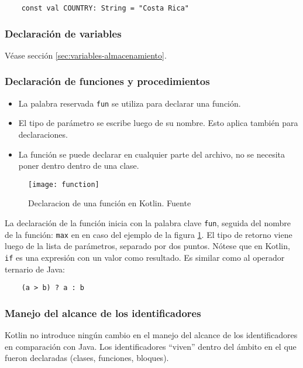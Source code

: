 \begin{verbatim}
    const val COUNTRY: String = "Costa Rica"
\end{verbatim}

\subsubsection{Declaración de variables}
Véase sección \ref{sec:variables-almacenamiento}.

\subsubsection{Declaración de funciones y procedimientos}
\begin{itemize}
    \item La palabra reservada \texttt{fun} se utiliza para declarar una función. 
    \item El tipo de parámetro se escribe luego de su nombre. Esto aplica también para declaraciones.
    \item La función se puede declarar en cualquier parte del archivo, no se necesita poner dentro dentro de una clase.
\end{itemize}

\begin{figure}[h!]
  \texttt{[image: function]}
  \caption{Declaracion de una función en Kotlin. Fuente \cite{kotlin-in-action}}
  \label{fig:kotlin-function-declaration}
\end{figure} 

La declaración de la función inicia con la palabra clave \texttt{fun}, seguida del nombre de la función: \texttt{max} en en caso del ejemplo de la figura \ref{fig:kotlin-function-declaration}. El tipo de retorno viene luego de la lista de parámetros, separado por dos puntos. Nótese que en Kotlin, \texttt{if} es una expresión con un valor como resultado. Es similar como al operador ternario de Java: 
\begin{verbatim}
    (a > b) ? a : b
\end{verbatim}

\subsubsection{Manejo del alcance de los identificadores}
Kotlin no introduce ningún cambio en el manejo del alcance de los identificadores en comparación con Java. Los identificadores ``viven'' dentro del ámbito en el que fueron declaradas (clases, funciones, bloques).

